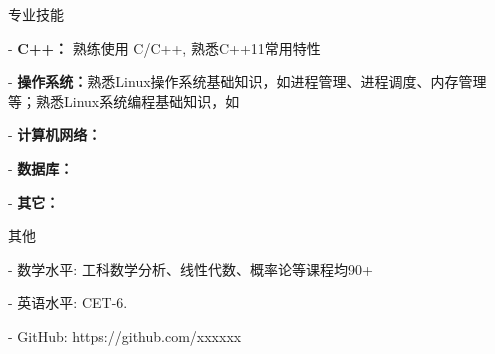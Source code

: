 \documentclass{resume} %
\begin{document}

\begin{rSection}{专业技能}
\begin{rSubsection}
{}{}{}{}
\item[-] \textbf{C++：} 熟练使用 C/C++, 熟悉C++11常用特性
\item[-] \textbf{操作系统：}熟悉Linux操作系统基础知识，如进程管理、进程调度、内存管理等；熟悉Linux系统编程基础知识，如
\item[-] \textbf{计算机网络：}
\item[-] \textbf{数据库：}
\item[-] \textbf{其它：}
\end{rSubsection}
\end{rSection}


\begin{rSection}{其他}
\begin{rSubsection}
{}{}{}{}
\item[-] 数学水平: 工科数学分析、线性代数、概率论等课程均90+
\item[-] 英语水平: CET-6.
\item[-] GitHub: https://github.com/xxxxxx
\end{rSubsection}
\end{rSection}
\end{document}
